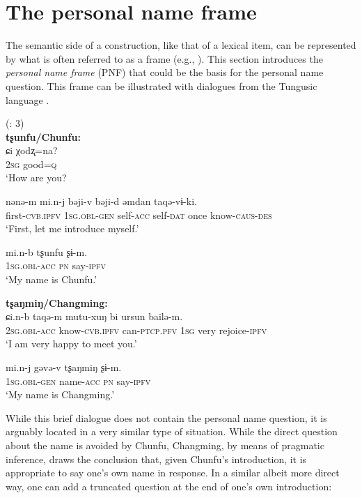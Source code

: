 \documentclass[output=paper,colorlinks,citecolor=brown]{langscibook}
\begin{document}
\section{The personal name frame}\label{section4.3}

The semantic side of a construction, like that of a lexical item, can be represented by what is often referred to as a frame (e.g., \citealt{Fillmore1985}). This section introduces the \textit{personal name frame} (PNF) that could be the basis for the personal name question. This frame can be illustrated with dialogues from the Tungusic language .

\ea
    \label{example4.51}
     (\citealt{Jin1993}: 3)\\
    \ea
   \textbf{ tʂunfu/Chunfu:}\\
    \gll ɕi		χodʐ=na?\\
    2\textsc{sg}		good=\textsc{q}\\
    \glt ‘How are you?

    \ex
    \gll nənə-m			mi.n-j			bəji-v  bəji-d		əmdan	taqə-vɨ-ki.\\
    first-\textsc{cvb.ipfv}		1\textsc{sg.obl-gen}		self-\textsc{acc}   self-\textsc{dat}		once		know-\textsc{caus-des}\\
    \glt ‘First, let me introduce myself.’

    \ex
    \gll mi.n-b			tʂunfu	ʂɨ-m.\\
    1\textsc{sg.obl-acc}		\textsc{pn}		say-\textsc{ipfv}\\
    \glt ‘My name is Chunfu.’

    \ex
    \textbf{tʂaŋmiŋ/Changming:}\\
    \gll ɕi.n-b			taqə-m			mutu-xuŋ	bi		ursun   bailə-m.\\
    2\textsc{sg.obl-acc}		know-\textsc{cvb.ipfv}		can-\textsc{ptcp.pfv}	1\textsc{sg}		very    rejoice-\textsc{ipfv}\\
    \glt ‘I am very happy to meet you.’

    \ex
    \gll mi.n-j			gəvə-v		tʂaŋmiŋ	ʂɨ-m.\\
    1\textsc{sg.obl-gen}		name-\textsc{acc}		\textsc{pn}		say-\textsc{ipfv}\\
    \glt ‘My name is Changming.’
    \z
\z

\noindent While this brief dialogue does not contain the personal name question, it is arguably located in a very similar type of situation. While the direct question about the name is avoided by Chunfu, Changming, by means of pragmatic inference, draws the conclusion that, given Chunfu’s introduction, it is appropriate to say one’s own name in response. In a similar albeit more direct way, one can add a truncated question at the end of one’s own introduction:
\end{document}
